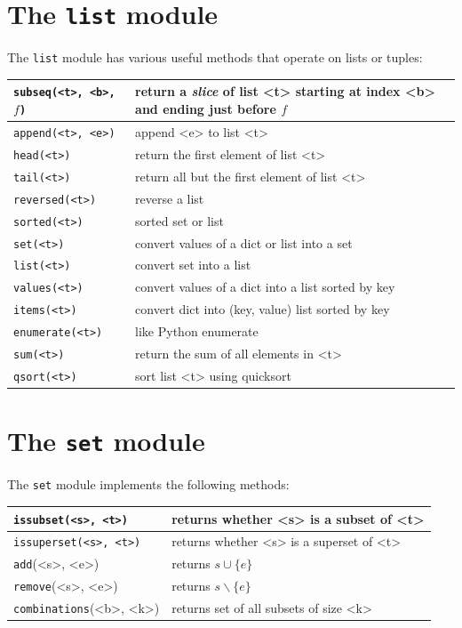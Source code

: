 \documentclass{report}
\begin{document}
\section{The \texttt{list} module}
\label{ap:list}

%
The \texttt{list} module has various useful methods that operate on lists
or tuples:

\vspace{1em}
\begin{tabular}{|l|l|}
\hline
\texttt{subseq(<{t}>, <{b}>, $f$)} & return a \emph{slice} of list <{t}> starting
at index <{b}> and ending just before $f$\\
\hline
\texttt{append(<{t}>, <{e}>)} & append <{e}> to list <{t}>\\
\hline
\texttt{head(<{t}>)} & return the first element of list <{t}>\\
\hline
\texttt{tail(<{t}>)} & return all but the first element of list <{t}>\\
\hline
\texttt{reversed(<{t}>)} & reverse a list \\
\hline
\texttt{sorted(<{t}>)} & sorted set or list \\
\hline
\texttt{set(<{t}>)} & convert values of a dict or list into a set \\
\hline
\texttt{list(<{t}>)} & convert set into a list \\
\hline
\texttt{values(<{t}>)} & convert values of a dict into a list sorted by key \\
\hline
\texttt{items(<{t}>)} & convert dict into (key, value) list sorted by key \\
\hline
\texttt{enumerate(<{t}>)} & like Python enumerate \\
\hline
\texttt{sum(<{t}>)} & return the sum of all elements in <{t}>\\
\hline
\texttt{qsort(<{t}>)} & sort list <{t}> using quicksort\\
\hline
\end{tabular}

\section{The \texttt{set} module}
\label{ap:set}

The \texttt{set} module
%
implements the following methods:

\vspace{1em}
\begin{tabular}{|l|l|}
\hline
\texttt{issubset(<{s}>, <{t}>)} & returns whether <{s}> is a subset of <{t}> \\
\hline
\texttt{issuperset(<{s}>, <{t}>)} & returns whether <{s}> is a superset of <{t}> \\
\hline
\texttt{add}(<{s}>, <{e}>) & returns $s \cup \{ e \}$ \\
\hline
\texttt{remove}(<{s}>, <{e}>) & returns $s \backslash \{ e \}$ \\
\hline
\texttt{combinations}(<{b}>, <{k}>) & returns set of all subsets of size <{k}> \\
\hline
\end{tabular}
\end{document}
